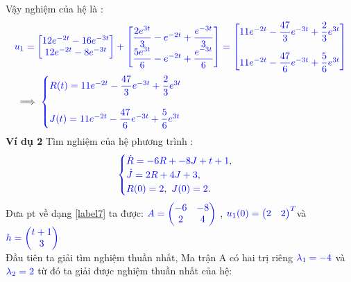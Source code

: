 \documentclass[a4paper]{article}
\begin{document}
 Vậy nghiệm của hệ là :
 \begin{align}
  & \textcolor{blue}{  u_1=\begin{bmatrix} 12e^{-2t}  -16e^{-3t}\\ 12e^{-2t} - 8e^{-3t} \end{bmatrix}+\begin{bmatrix} \dfrac{2e^{3t}}{3}-e^{-2t}+\dfrac{e^{-3t}}{3}    \\ \dfrac{5e^{3t}}{6}-e^{-2t}+\dfrac{e^{-3t}}{6}   \end{bmatrix}=\begin{bmatrix} 11e^{-2t} -\dfrac{47}{3}e^{-3t}+\dfrac{2}{3}e^{3t}\\ \\11e^{-2t} - \dfrac{47}{6}e^{-3t}+\dfrac{5}{6}e^{3t} \end{bmatrix}}\\
 &\implies\textcolor{blue}{  \begin{cases}
     \textcolor{blue}
{R(t)=11e^{-2t} -\dfrac{47}{3}e^{-3t}+\dfrac{2}{3}e^{3t}}\\\\\textcolor{blue}
{J(t)=11e^{-2t} - \dfrac{47}{6}e^{-3t}+\dfrac{5}{6}e^{3t} }
\end{cases}}
 \end{align}
\textbf{Ví dụ 2} Tìm nghiệm của hệ phương trình :
 \begin{align}
	    \textcolor{blue}{
	    \begin{cases}
            \dot R = -6R + -8J + t+1 \textcolor{black}{,}\\
            \dot J = 2R + 4J + 3\textcolor{black}{,}\\
            R(0) = 2\textcolor{black}{,} \enskip J(0) = 2 \textcolor{black}{.}
        \end{cases}
        }
        \label{label9}
	\end{align}
 Đưa pt về dạng \eqref{label7} ta được: 
 \notag
 $\textcolor{blue}{A = \begin{pmatrix} -6 & -8\\ 2 & 4 \end{pmatrix}}$ , \enskip $\textcolor{blue}{u_1(0) = \begin{pmatrix} 2 & 2 \end{pmatrix}\sp{T}}$\enskip và   $\textcolor{blue}{h =\begin{pmatrix} t+1 \\ 3 \end{pmatrix}}$\\
 Đầu tiên ta giải tìm nghiệm thuần nhất, Ma trận A có hai trị riêng $\textcolor{blue}{\lambda_1=-4}$ và $\textcolor{blue}{\lambda_2=2 }$ từ đó  ta giải được nghiệm thuần nhất của hệ:\\
\end{document}

